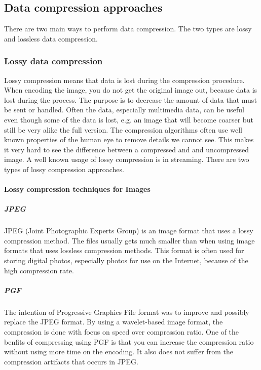 \newpage

\subsection{Data compression approaches}
There are two main ways to perform data compression. The two types are lossy and lossless data compression. \cite{bib:dataCompression}

\subsubsection{Lossy data compression}
Lossy compression means that data is lost during the compression procedure. When encoding the image, you do not get the original image out, because data is lost during the process. The purpose is to decrease the amount of data that must be sent or handled. Often the data, especially multimedia data, can be useful even though some of the data is lost, e.g. an image that will become coarser but still be very alike the full version. The compression algorithms often use well known properties of the human eye to remove details we cannot see. This makes it very hard to see the difference between a compressed and and uncompressed image. A well known usage of lossy compression is in streaming. There are two types of lossy compression approaches. \cite{bib:lossyCompression}

\paragraph{Lossy compression techniques for Images}

\subparagraph{JPEG} \hfill
\newline
JPEG (Joint Photographic Experts Group) is an image format that uses a lossy compression method. The files usually gets much smaller than when using image formats that uses lossless compression methods. This format is often used for storing digital photos, especially photos for use on the Internet, because of the high compression rate. \cite{bib:JPEG}


\subparagraph{PGF} \hfill
\newline
The intention of Progressive Graphics File format was to improve and possibly replace the JPEG format. By using a wavelet-based image format, the compression is done with focus on speed over compression ratio. One of the benfits of compressing using PGF is that you can increase the compression ratio without using more time on the encoding. It also does not suffer from the compression artifacts that occurs in JPEG.
\cite{bib:PGF}


